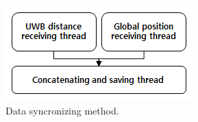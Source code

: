 \documentclass[letterpaper, 10 pt, conference]{ieeeconf}  %
\begin{document}
\begin{figure}[h]
	\centering
	\includegraphics[width=.9\linewidth]{savingThread}
	\caption{Data syncronizing method.}
	\label{fig:sync}
\end{figure}
\end{document}

